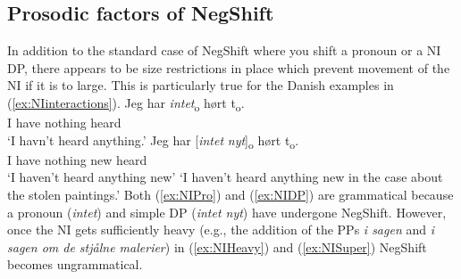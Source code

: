 \documentclass[12pt, letterpaper]{article}
\begin{document}
\subsection{Prosodic factors of NegShift} \label{sec:Confound}

In addition to the standard case of NegShift where you shift a pronoun or a NI DP, there appears to be size restrictions in place which prevent movement of the NI if it is to large. This is particularly true for the Danish examples in (\ref{ex:NIinteractions}). 
	\ea\label{ex:NIinteractions}
		\ea 
		\gll Jeg har \textit{intet}\textsubscript{o} hørt t\textsubscript{o}.\\
		I have nothing heard\\
		\glt  `I havn't heard anything.'\label{ex:NIPro}
		\ex 
		\gll Jeg har [\textit{intet} \textit{nyt}]\textsubscript{o} hørt t\textsubscript{o}.\\
		I have nothing new heard\\
		\glt `I haven't heard anything new'\label{ex:NIDP}
		\glt `I haven't heard anything new in the case about the stolen paintings.'\label{ex:NISuper}
		\z 
	\z
Both (\ref{ex:NIPro}) and (\ref{ex:NIDP}) are grammatical because a pronoun (\emph{intet}) and simple DP (\emph{intet nyt}) have undergone NegShift. However, once the NI gets sufficiently heavy (e.g., the addition of the PPs \emph{i sagen} and \emph{i sagen om de stjålne malerier}) in (\ref{ex:NIHeavy}) and (\ref{ex:NISuper}) NegShift becomes ungrammatical. 
\end{document}
